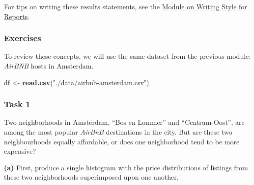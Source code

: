 \documentclass[
]{book}
\newenvironment{Shaded}{\begin{snugshade}}{\end{snugshade}}
\newcommand{\KeywordTok}[1]{\textcolor[rgb]{0.13,0.29,0.53}{\textbf{#1}}}
\newcommand{\NormalTok}[1]{#1}
\newcommand{\StringTok}[1]{\textcolor[rgb]{0.31,0.60,0.02}{#1}}
\begin{document}
For tips on writing these results statements, see the \protect\hyperlink{style}{Module on Writing Style for Reports}.

\hypertarget{exercises-10}{%
\subsubsection*{Exercises}\label{exercises-10}}

To review these concepts, we will use the same dataset from the previous module: \emph{AirBNB} hosts in Amsterdam.

\begin{Shaded}
\begin{Highlighting}[]
\NormalTok{df <-}\StringTok{ }\KeywordTok{read.csv}\NormalTok{(}\StringTok{"./data/airbnb-amsterdam.csv"}\NormalTok{)}
\end{Highlighting}
\end{Shaded}

\hypertarget{task-1-1}{%
\subsubsection*{Task 1}\label{task-1-1}}

Two neighborhoods in Amsterdam, ``Bos en Lommer'' and ``Centrum-Oost'', are among the most popular \emph{AirBnB} destinations in the city. But are these two neighbourhoods equally affordable, or does one neighborhood tend to be more expensive?

\textbf{(a)} First, produce a single histogram with the price distributions of listings from these two neighborhoods superimposed upon one another.
\end{document}

